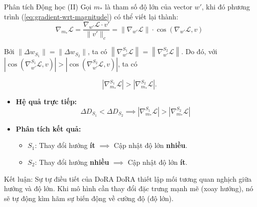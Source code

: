 \documentclass[11pt,aspectratio=169]{beamer}
\begin{document}
\begin{frame}[t]{Phân tích Động học (II)}
    \scriptsize
        Gọi $m_{*}$ là tham số độ lớn của vector $w'$, khi đó phương trình (\ref{eq:gradient-wrt-magnitude}) có thể viết lại thành:
    $$\nabla_{m_{*}} \mathcal{L} = \frac{\nabla_{w'} \mathcal{L} \cdot v'}{\|v'\|_c} = \left\|\nabla_{w'} \mathcal{L}\right\| \cdot \cos(\nabla_{w'} \mathcal{L}, v)$$
    
    Bởi $\|\Delta w_{S_1}\| =  \|\Delta w_{S_2}\|$, ta có $\left\|\nabla_{w'}^{S_1} \mathcal{L}\right\| = \left\|\nabla_{w'}^{S_2} \mathcal{L}\right\|$. Do đó, với $|\cos(\nabla_{w'}^{S_1} \mathcal{L}, v)| > |\cos(\nabla_{w'}^{S_2} \mathcal{L}, v)|$, ta có 
    
    $$\left|\nabla_{m_{*}}^{S_1} \mathcal{L}\right| > \left|\nabla_{m_{*}}^{S_2} \mathcal{L}\right|.$$
    \begin{itemize}
    \item \textbf{Hệ quả trực tiếp:}
    $$
        \Delta D_{S_1} < \Delta D_{S_2} \implies \left|\nabla_{m_{*}}^{S_1} \mathcal{L}\right| > \left|\nabla_{m_{*}}^{S_2} \mathcal{L}\right|
    $$
    
    \item \textbf{Phân tích kết quả:}
    \begin{itemize}
        \item $S_1$: Thay đổi hướng \textbf{ít} $\implies$ Cập nhật độ lớn \textbf{nhiều}.
        \item $S_2$: Thay đổi hướng \textbf{nhiều} $\implies$ Cập nhật độ lớn \textbf{ít}.
    \end{itemize}
\end{itemize}

\begin{block}{Kết luận: Sự tự điều tiết của DoRA}
DoRA thiết lập mối tương quan nghịch giữa hướng và độ lớn. Khi mô hình cần thay đổi đặc trưng mạnh mẽ (xoay hướng), nó sẽ tự động kìm hãm sự biến động về cường độ (độ lớn).
\end{block}
\end{frame}
\end{document}
